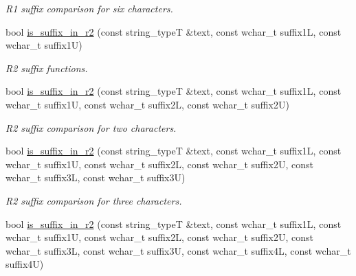 \begin{DoxyCompactItemize}
\begin{DoxyCompactList}\small\item\em R1 suffix comparison for six characters. \end{DoxyCompactList}\item 
bool \hyperlink{classstemming_1_1stem_ac2c9cace7e6d90ca0b8c08f2ca2809e3}{is\+\_\+suffix\+\_\+in\+\_\+r2} (const string\+\_\+type\+T \&text, const wchar\+\_\+t suffix1\+L, const wchar\+\_\+t suffix1\+U)
\begin{DoxyCompactList}\small\item\em R2 suffix functions. \end{DoxyCompactList}\item 
\hypertarget{classstemming_1_1stem_a8325bde2b5c8d5676d2b8e2b822b29a4}{bool \hyperlink{classstemming_1_1stem_a8325bde2b5c8d5676d2b8e2b822b29a4}{is\+\_\+suffix\+\_\+in\+\_\+r2} (const string\+\_\+type\+T \&text, const wchar\+\_\+t suffix1\+L, const wchar\+\_\+t suffix1\+U, const wchar\+\_\+t suffix2\+L, const wchar\+\_\+t suffix2\+U)}\label{classstemming_1_1stem_a8325bde2b5c8d5676d2b8e2b822b29a4}

\begin{DoxyCompactList}\small\item\em R2 suffix comparison for two characters. \end{DoxyCompactList}\item 
\hypertarget{classstemming_1_1stem_ab5c71d01e3285eec2e79521c1b76f79d}{bool \hyperlink{classstemming_1_1stem_ab5c71d01e3285eec2e79521c1b76f79d}{is\+\_\+suffix\+\_\+in\+\_\+r2} (const string\+\_\+type\+T \&text, const wchar\+\_\+t suffix1\+L, const wchar\+\_\+t suffix1\+U, const wchar\+\_\+t suffix2\+L, const wchar\+\_\+t suffix2\+U, const wchar\+\_\+t suffix3\+L, const wchar\+\_\+t suffix3\+U)}\label{classstemming_1_1stem_ab5c71d01e3285eec2e79521c1b76f79d}

\begin{DoxyCompactList}\small\item\em R2 suffix comparison for three characters. \end{DoxyCompactList}\item 
\hypertarget{classstemming_1_1stem_ac12e9f11d41f69e71c7379387c4564b9}{bool \hyperlink{classstemming_1_1stem_ac12e9f11d41f69e71c7379387c4564b9}{is\+\_\+suffix\+\_\+in\+\_\+r2} (const string\+\_\+type\+T \&text, const wchar\+\_\+t suffix1\+L, const wchar\+\_\+t suffix1\+U, const wchar\+\_\+t suffix2\+L, const wchar\+\_\+t suffix2\+U, const wchar\+\_\+t suffix3\+L, const wchar\+\_\+t suffix3\+U, const wchar\+\_\+t suffix4\+L, const wchar\+\_\+t suffix4\+U)}\label{classstemming_1_1stem_ac12e9f11d41f69e71c7379387c4564b9}


\end{DoxyCompactItemize}
